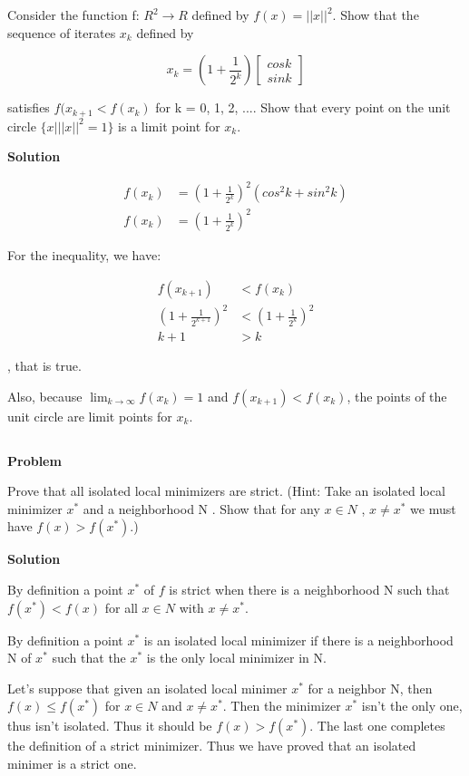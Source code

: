 \documentclass[a4paper,11pt]{article}
\numberwithin{equation}{section} %
\begin{document}
Consider the function f: $R^2 \rightarrow R$ defined by $f(x) = {||x||}^2$. Show that the sequence of iterates {$x_k$} defined by

\[x_k = (1 + \frac{1}{2^k}) \begin{bmatrix}
    cosk \\ sink
\end{bmatrix}\]

satisfies $f(x_{k+1} < f(x_k)$ for k = 0, 1, 2, .... Show that every point on the unit circle $\{x | {||x||}^2 = 1\}$ is a limit point for {$x_k$}.

\textbf{Solution}

\begin{align}
    f(x_k) &= (1+\frac{1}{2^k})^2(cos^2k + sin^2k) \\
    f(x_k) &= (1+\frac{1}{2^k})^2
\end{align}

For the inequality, we have:

\begin{align}
    f(x_{k+1}) &< f(x_k) \\
    (1 + \frac{1}{2^{k+1}})^2 &< (1 + \frac{1}{2^k})^2 \\
    k+1 &> k
\end{align}

, that is true.

Also, because $\lim_{k\to\infty} f(x_k) = 1$ and $f(x_{k+1}) < f(x_k)$, the points of the unit circle are limit points for {$x_k$}.

\subsection{}

\textbf{Problem}

Prove that all isolated local minimizers are strict. (Hint: Take an isolated local
minimizer $x^{*}$ and a neighborhood N . Show that for any $x \in N$ , $x \neq x^{*}$ we must have $f(x) > f(x^{*})$.)

\textbf{Solution}

By definition a point $x^{*}$ of $f$ is strict when there is a neighborhood N such that $f(x^{*}) < f(x)$ for all $x \in N$ with $x \neq x^{*}$.

By definition a point $x^{*}$ is an isolated local minimizer if there is a neighborhood N of $x^{*}$ such that the $x^{*}$ is the only local minimizer in N.

Let's suppose that given an isolated local minimer $x^{*}$ for a neighbor N, then $f(x) \leq f(x^{*})$ for $x \in N$ and $x \neq x^{*}$. Then the minimizer $x^{*}$ isn't the only one, thus isn't isolated. Thus it should be $f(x) > f(x^{*})$. The last one completes the definition of a strict minimizer. Thus we have proved that an isolated minimer is a strict one.
\end{document}
